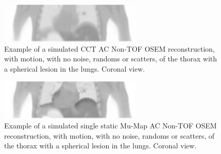             \begin{figure}
                \centering
                
                \includegraphics[width=1.0\linewidth]{figures/background_motion_artefact_example.png}
                
                \captionsetup{singlelinecheck=false}
                \caption{
                    Example of a simulated \gls{CCT} \gls{AC} \gls{Non-TOF} \gls{OSEM} reconstruction, with motion, with no noise, randoms or scatters, of the thorax with a spherical lesion in the lungs. Coronal view.
                }
                \label{fig:respiratory_motion_artefacts_motion_artefact}
            \end{figure}
            
            \begin{figure}
                \centering
                
                \includegraphics[width=1.0\linewidth]{figures/background_single_mu_map_ac_example.png}
                
                \captionsetup{singlelinecheck=false}
                \caption{
                    Example of a simulated single static \gls{Mu-Map} \gls{AC} \gls{Non-TOF} \gls{OSEM} reconstruction, with motion, with no noise, randoms or scatters, of the thorax with a spherical lesion in the lungs. Coronal view.
                }
                \label{fig:respiratory_motion_artefacts_single_mu_map_ac}
            \end{figure}
            
